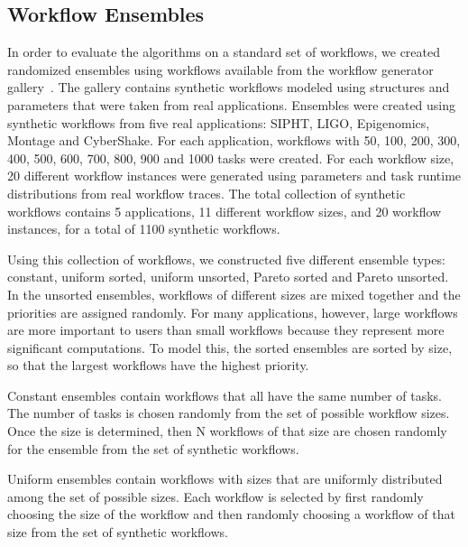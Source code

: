 \documentclass[preprint,5p]{elsarticle}
\begin{document}
\subsection{Workflow Ensembles}
\label{sec:ensembles}


In order to evaluate the algorithms on a standard set of workflows, we created
randomized ensembles using workflows available from the workflow generator
gallery~\cite{WorkflowGenerator}. The
gallery contains synthetic workflows modeled using structures and parameters
that were taken from real applications. Ensembles were created using synthetic
workflows from five real applications: SIPHT, LIGO, Epigenomics, Montage and
CyberShake. For each application, workflows with 50, 100, 200, 300,
400, 500, 600, 700, 800, 900 and 1000 tasks were created. For each workflow
size, 20 different workflow instances were generated using parameters and task
runtime distributions from real workflow traces. The total collection of
synthetic workflows contains 5 applications, 11 different workflow sizes, and 20
workflow instances, for a total of 1100 synthetic workflows.


Using this collection of workflows, we constructed five different ensemble types:
constant, uniform sorted, uniform unsorted, Pareto sorted and Pareto unsorted.
In the unsorted ensembles, workflows of different sizes are mixed together and
the priorities are assigned randomly.
For many applications, however, large workflows are
more important to users than small workflows because they represent more
significant computations. To model this, the sorted ensembles are sorted by
size, so that the largest workflows have the highest priority.

Constant ensembles contain workflows that all have the same number of tasks. 
The number of tasks is chosen randomly from the set of
possible workflow sizes. Once the size is determined, then N workflows of that
size are chosen randomly for the ensemble from the set of synthetic workflows.

Uniform ensembles contain workflows with sizes that are uniformly distributed
among the set of possible sizes. Each workflow 
is selected by first randomly choosing the size of the workflow
and then randomly choosing a workflow of that size from the set of
synthetic workflows.
\end{document}
